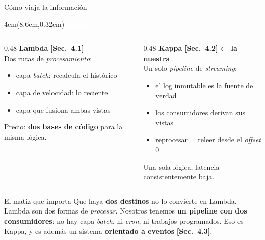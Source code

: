 \documentclass[aspectratio=169,11pt]{beamer}
\newcommand{\sect}[1]{\textcolor{acento}{\small\textbf{[Sec.~#1]}}}
\newcommand{\quien}[1]{%
  \begin{textblock*}{4cm}(8.6cm,0.32cm)
    \tiny\textcolor{white}{\textbf{#1}}
  \end{textblock*}}
\begin{document}
\begin{frame}{Cómo viaja la información}
\quien{Elizabeth}
\begin{columns}[T]
\begin{column}{0.48\textwidth}
\textbf{Lambda} \sect{4.1}\\[2pt]
\footnotesize
Dos rutas de \emph{procesamiento}:
\begin{itemize}\itemsep1pt
\item capa \emph{batch}: recalcula el histórico
\item capa de velocidad: lo reciente
\item capa que fusiona ambas vistas
\end{itemize}
\vspace{3pt}
Precio: \textbf{dos bases de código} para la misma lógica.
\end{column}
\begin{column}{0.48\textwidth}
\textbf{Kappa} \sect{4.2} \quad\textcolor{verde}{\small\textbf{← la nuestra}}\\[2pt]
\footnotesize
Un solo \emph{pipeline} de \emph{streaming}:
\begin{itemize}\itemsep1pt
\item el log inmutable es la fuente de verdad
\item los consumidores derivan sus vistas
\item reprocesar = releer desde el \emph{offset} 0
\end{itemize}
\vspace{3pt}
Una sola lógica, latencia consistentemente baja.
\end{column}
\end{columns}

\vspace{6pt}
\begin{block}{\small El matiz que importa}
\footnotesize
Que haya \textbf{dos destinos} no lo convierte en Lambda. Lambda son dos formas
de \emph{procesar}. Nosotros tenemos \textbf{un pipeline con dos consumidores}:
no hay capa \emph{batch}, ni \emph{cron}, ni trabajos programados. Eso es Kappa,
y es además un sistema \textbf{orientado a eventos} \sect{4.3}.
\end{block}
\end{frame}
\end{document}
